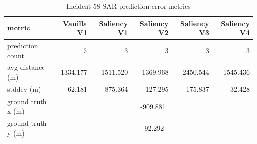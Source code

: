 \begin{table}[ht]
\centering
\caption{Incident 58 SAR prediction error metrics}
\label{tab:sar-incident-58}
\begin{tabular}{lrrrrr}
\hline
metric & Vanilla V1 & Saliency V1 & Saliency V2 & Saliency V3 & Saliency V4 \\
\hline
prediction count & 3 & 3 & 3 & 3 & 3 \\
avg distance (m) & 1334.177 & 1511.520 & 1369.968 & 2450.544 & 1545.436 \\
stddev (m) & 62.181 & 875.364 & 127.295 & 175.837 & 32.428 \\
ground truth x (m) & \multicolumn{5}{c}{-909.881} \\
ground truth y (m) & \multicolumn{5}{c}{-92.292} \\
\hline
\end{tabular}
\end{table}
